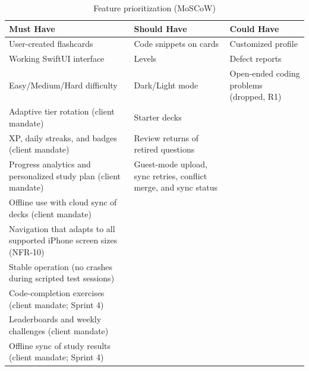 \documentclass[12pt,letterpaper]{article}
\begin{document}
\begin{table}[H]
\centering
\caption{Feature prioritization (MoSCoW)}
\label{tab:moscow}
\begin{tabularx}{\textwidth}{@{}Y Y Y@{}}
\toprule
\textbf{Must Have} & \textbf{Should Have} & \textbf{Could Have} \\
\midrule
User-created flashcards & Code snippets on cards & Customized profile \\
Working SwiftUI interface & Levels & Defect reports \\
Easy/Medium/Hard difficulty & Dark/Light mode & Open-ended coding problems (dropped, R1) \\
Adaptive tier rotation (client mandate) & Starter decks & \\
XP, daily streaks, and badges (client mandate) & Review returns of retired questions & \\
Progress analytics and personalized study plan (client mandate) & Guest-mode upload, sync retries, conflict merge, and sync status & \\
Offline use with cloud sync of decks (client mandate) & & \\
Navigation that adapts to all supported iPhone screen sizes (NFR-10) & & \\
Stable operation (no crashes during scripted test sessions) & & \\
Code-completion exercises (client mandate; Sprint 4) & & \\
Leaderboards and weekly challenges (client mandate) & & \\
Offline sync of study results (client mandate; Sprint 4) & & \\
\bottomrule
\end{tabularx}
\end{table}

\end{document}
